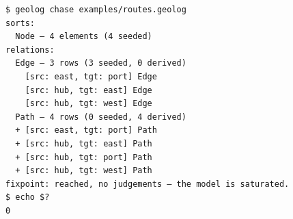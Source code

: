 \begin{Verbatim}[fontsize=\small,frame=leftline,rulecolor=\color{accentmid},framesep=3mm,xleftmargin=3mm]
$ geolog chase examples/routes.geolog
sorts:
  Node — 4 elements (4 seeded)
relations:
  Edge — 3 rows (3 seeded, 0 derived)
    [src: east, tgt: port] Edge
    [src: hub, tgt: east] Edge
    [src: hub, tgt: west] Edge
  Path — 4 rows (0 seeded, 4 derived)
  + [src: east, tgt: port] Path
  + [src: hub, tgt: east] Path
  + [src: hub, tgt: port] Path
  + [src: hub, tgt: west] Path
fixpoint: reached, no judgements — the model is saturated.
$ echo $?
0
\end{Verbatim}
